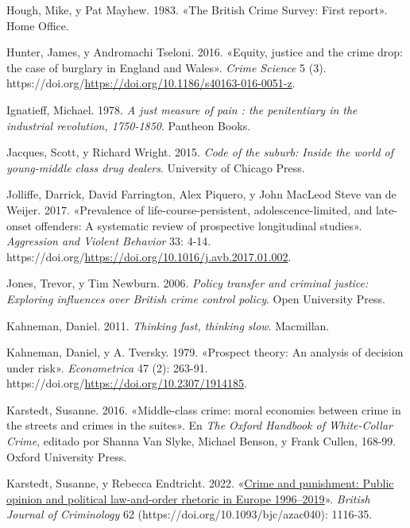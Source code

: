 \documentclass[
  spanish,
  letterpaper,
  DIV=11,
  numbers=noendperiod]{scrreprt}
\newlength{\cslhangindent}
\newenvironment{CSLReferences}[2] %
 {\begin{list}{}{%
  \setlength{\itemindent}{0pt}
  \setlength{\leftmargin}{0pt}
  \setlength{\parsep}{0pt}
  \ifodd #1
   \setlength{\leftmargin}{\cslhangindent}
   \setlength{\itemindent}{-1\cslhangindent}
  \fi
  \setlength{\itemsep}{#2\baselineskip}}}
 {\end{list}}
\begin{document}
\begin{CSLReferences}{1}{0}
Hough, Mike, y Pat Mayhew. 1983. {«The British Crime Survey: First
report»}. Home Office.

Hunter, James, y Andromachi Tseloni. 2016. {«Equity, justice and the
crime drop: the case of burglary in England and Wales»}. \emph{Crime
Science} 5 (3).
https://doi.org/\url{https://doi.org/10.1186/s40163-016-0051-z}.

Ignatieff, Michael. 1978. \emph{A just measure of pain : the
penitentiary in the industrial revolution, 1750-1850}. Pantheon Books.

Jacques, Scott, y Richard Wright. 2015. \emph{Code of the suburb: Inside
the world of young-middle class drug dealers}. University of Chicago
Press.

Jolliffe, Darrick, David Farrington, Alex Piquero, y John MacLeod Steve
van de Weijer. 2017. {«Prevalence of life-course-persistent,
adolescence-limited, and late-onset offenders: A systematic review of
prospective longitudinal studies»}. \emph{Aggression and Violent
Behavior} 33: 4-14.
https://doi.org/\url{https://doi.org/10.1016/j.avb.2017.01.002}.

Jones, Trevor, y Tim Newburn. 2006. \emph{Policy transfer and criminal
justice: Exploring influences over British crime control policy}. Open
University Press.

Kahneman, Daniel. 2011. \emph{Thinking fast, thinking slow}. Macmillan.

Kahneman, Daniel, y A. Tversky. 1979. {«Prospect theory: An analysis of
decision under risk»}. \emph{Econometrica} 47 (2): 263-91.
https://doi.org/\url{https://doi.org/10.2307/1914185}.

Karstedt, Susanne. 2016. {«Middle-class crime: moral economies between
crime in the streets and crimes in the suites»}. En \emph{The Oxford
Handbook of White-Collar Crime}, editado por Shanna Van Slyke, Michael
Benson, y Frank Cullen, 168-99. Oxford University Press.

Karstedt, Susanne, y Rebecca Endtricht. 2022. {«\href{}{Crime and
punishment: Public opinion and political law-and-order rhetoric in
Europe 1996--2019}»}. \emph{British Journal of Criminology} 62
(https://doi.org/10.1093/bjc/azac040): 1116-35.


\end{CSLReferences}
\end{document}
